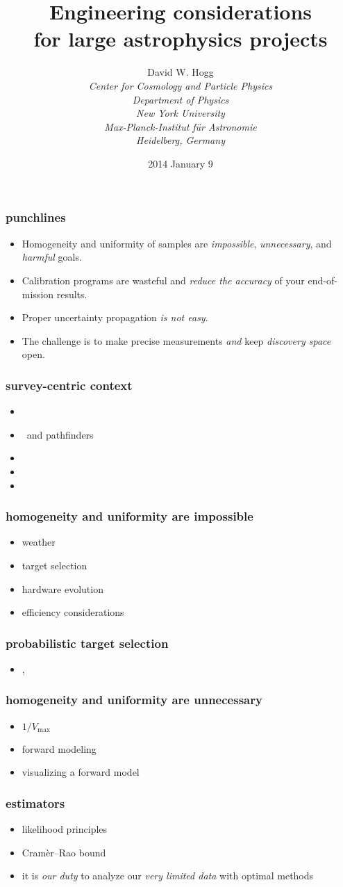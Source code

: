 \documentclass[pdftex]{beamer}
\title{Engineering considerations\\ for large astrophysics projects}
\author[David W. Hogg (NYU)]{David W. Hogg \\[1ex]
  \textsl{\small Center for Cosmology and Particle Physics\\
                 Department of Physics\\
                 New York University\\[1ex]
                 Max-Planck-Institut f\"ur Astronomie\\
                 Heidelberg, Germany}}
\date{2014 January 9}
\newcommand{\conclusionslide}{
\begin{frame}
  \frametitle{punchlines}
  \begin{itemize}
  \item Homogeneity and uniformity of samples are \emph{impossible}, \emph{unnecessary}, and \emph{harmful} goals.
  \item Calibration programs are wasteful and \emph{reduce the accuracy} of your end-of-mission results.
  \item Proper uncertainty propagation \emph{is not easy}.
  \item The challenge is to make precise measurements \emph{and} keep \emph{discovery space} open.
  \end{itemize}
\end{frame}
}
\begin{document}
\begin{frame}
  \titlepage
\end{frame}

\conclusionslide

\begin{frame}
  \frametitle{survey-centric context}
  \begin{itemize}
  \item \gaia
  \item \ska\ and pathfinders
  \item \euclid
  \item \lsst
  \item \sdssiv
  \end{itemize}
\end{frame}

\begin{frame}
  \frametitle{homogeneity and uniformity are impossible}
  \begin{itemize}
  \item weather
  \item target selection
  \item hardware evolution
  \item efficiency considerations
  \end{itemize}
\end{frame}

\begin{frame}
  \frametitle{probabilistic target selection}
  \begin{itemize}
  \item \sdssiii, \sdssiv
  \end{itemize}
\end{frame}

\begin{frame}
  \frametitle{homogeneity and uniformity are unnecessary}
  \begin{itemize}
  \item $1 / V_{\mathrm{max}}$
  \item forward modeling
  \item visualizing a forward model
  \end{itemize}
\end{frame}

\begin{frame}
  \frametitle{estimators}
  \begin{itemize}
  \item likelihood principles
  \item Cram\`er--Rao bound
  \item it is \emph{our duty} to analyze our \emph{very limited data} with optimal methods
  \end{itemize}
\end{frame}
\end{document}
